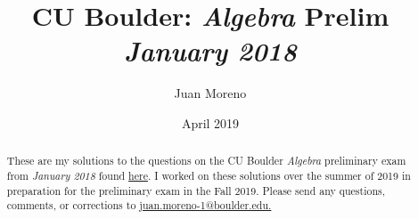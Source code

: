 \documentclass[11pt]{article}
\newcommand{\1}{\textbf{1}}
\begin{document}
\title{\LARGE \textbf{CU Boulder: \textit{Algebra} %
Prelim \\ \textit{January 2018}} %
\vspace{-.75cm}}%
\author{Juan Moreno
} 
\date{\vspace{-0.45cm}April 2019} %

 
\maketitle

\renewcommand{\abstractname}{\vspace{-\baselineskip}}
\begin{abstract}
\noindent These are my solutions to the questions on the CU Boulder \textit{Algebra} preliminary exam from \textit{January 2018} found  \href{http://math.colorado.edu/documents/graduate/prelim/Algebra_Jan_2018.pdf}{here}. I worked on these solutions over the summer of 2019 in preparation for the preliminary exam in the Fall 2019. Please send any questions, comments, or corrections to \href{mailto: juan.moreno-1@boulder.edu}{juan.moreno-1@boulder.edu.} \\
\end{abstract}
\end{document}
